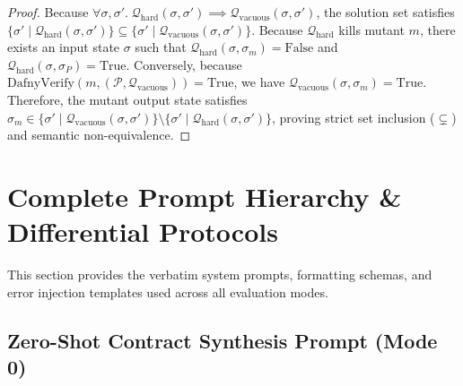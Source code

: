 \documentclass{article}
\begin{document}
\begin{proof}
Because $\forall \sigma, \sigma'. \; \mathcal{Q}_{\text{hard}}(\sigma, \sigma') \implies \mathcal{Q}_{\text{vacuous}}(\sigma, \sigma')$, the solution set satisfies $\{\sigma' \mid \mathcal{Q}_{\text{hard}}(\sigma, \sigma')\} \subseteq \{\sigma' \mid \mathcal{Q}_{\text{vacuous}}(\sigma, \sigma')\}$. Because $\mathcal{Q}_{\text{hard}}$ kills mutant $m$, there exists an input state $\sigma$ such that $\mathcal{Q}_{\text{hard}}(\sigma, \sigma_m) = \text{False}$ and $\mathcal{Q}_{\text{hard}}(\sigma, \sigma_P) = \text{True}$. Conversely, because $\text{DafnyVerify}(m, (\mathcal{P}, \mathcal{Q}_{\text{vacuous}})) = \text{True}$, we have $\mathcal{Q}_{\text{vacuous}}(\sigma, \sigma_m) = \text{True}$. Therefore, the mutant output state satisfies $\sigma_m \in \{\sigma' \mid \mathcal{Q}_{\text{vacuous}}(\sigma, \sigma')\} \setminus \{\sigma' \mid \mathcal{Q}_{\text{hard}}(\sigma, \sigma')\}$, proving strict set inclusion ($\subsetneq$) and semantic non-equivalence.
\end{proof}

\section{Complete Prompt Hierarchy \& Differential Protocols}
\label{app:prompts}

This section provides the verbatim system prompts, formatting schemas, and error injection templates used across all evaluation modes.

\subsection{Zero-Shot Contract Synthesis Prompt (Mode 0)}
\label{app:prompt_mode0}
\end{document}
